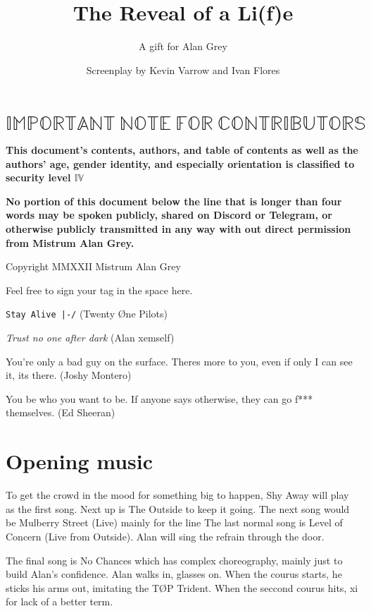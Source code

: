 \documentclass{article}
\title{The Reveal of a Li(f)e}
\author{A gift for Alan Grey}
\date{Screenplay by Kevin Varrow and Ivan Flores}
\begin{document}
\maketitle
\thispagestyle{fancy}
\tableofcontents
\section[$\mathbb{IMPORTANT\ NOTE}$]{$\mathbb{IMPORTANT\ NOTE\ FOR\ CONTRIBUTORS}$}
\textbf{This document's contents, authors, and table of contents as well as the authors' age, 
gender identity, and especially orientation is classified to security level $\mathbb{IV}$}

\noindent
\textbf{No portion of this document below the line that is longer than four words may be spoken publicly, shared on 
Discord or Telegram, or otherwise publicly transmitted in any way with out direct permission from Mistrum Alan Grey.}

\noindent
Copyright MMXXII Mistrum Alan Grey

\vspace{5mm}
Feel free to sign your tag in the space here. \vspace{2mm}

\noindent \texttt{Stay Alive |-/} (Twenty Øne Pilots) \vspace{2mm}

\noindent \emph{Trust no one after dark} (Alan xemself) \vspace{2mm}

\noindent You're only a bad guy on the surface. Theres more to you, even if only I can see it, its there. (Joshy Montero) \vspace{2mm}

\noindent You be who you want to be. If anyone says otherwise, they can go f*** themselves. (Ed Sheeran) \vspace{2mm}

\section{Opening music}
To get the crowd in the mood for something big to happen, Shy Away will play as the first song.
Next up is The Outside to keep it going. The next song would be Mulberry Street (Live)
mainly for the line  The last normal
song is Level of Concern (Live from Outside). Alan will sing the refrain through the door.

The final song is No Chances which has complex choreography, mainly just to build Alan's
confidence. Alan walks in, glasses on. When the courus starts, he sticks his arms out, 
imitating the TØP Trident. When the seccond courus hits, xi  for lack 
of a better term.
\end{document}

